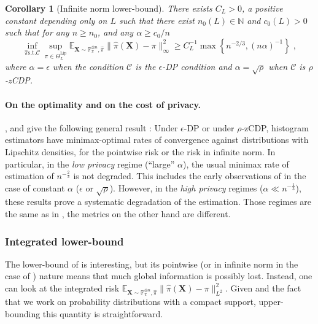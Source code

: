 \documentclass[10pt]{article} %
\newtheorem{corollary}{Corollary}
\newcommand{\N}[0]{\mathbb{N}}
\newcommand{\Prob}[0]{\mathbb{P}}
\newcommand{\E}[0]{\mathbb{E}}
\newcommand\vect[1]{\mathbf{#1}}
\newcommand\RG[1]{\textcolor{red}{#1}}
\newcommand\mRG[1]{\marginpar{\tiny\RG{#1}}}
\begin{document}
\begin{corollary}[Infinite norm lower-bound]
\label{cor:linfdp}
There exists $C_L>0$, a positive constant depending only on $L$ such that there exist $n_0(L) \in \N$ and $c_0(L) > 0$ such that for any $n \geq n_0$, and any 
$\alpha \geq c_0/n$
\begin{equation}
\label{eq:deftriangle}
    \inf_{\hat{\pi} \mathrm{ s.t. } \mathcal{C}} \sup_{\pi \in \Theta^{\mathrm{Lip}}_L}
    \E_{\vect{X} \sim \Prob_{\pi}^{\otimes n}, \hat{\pi}}\|\hat{\pi}(\vect{X})- \pi\|_{\infty}^2  \geq C_L^{-1} \max \left\{ n^{-2/3}, (n\alpha)^{-1} \right\}
    \;,
\end{equation}
where $\alpha = \epsilon$ when the condition $\mathcal{C}$ is the $\epsilon$-DP condition and $\alpha = \sqrt{\rho}$ when %
$\mathcal{C}$ is $\rho$-zCDP.
\end{corollary}

\paragraph{On the optimality and on the cost of privacy.}

,  and  give the following general result : Under $\epsilon$-DP or under $\rho$-zCDP, histogram estimators have minimax-optimal rates of convergence against distributions with Lipschitz densities, for the pointwise risk or the risk in infinite norm. In particular, in the \emph{low privacy} regime (``large'' $\alpha$), the usual minimax rate of estimation of $n^{-\frac{2}{3}}$ is not degraded. This includes the early observations of \citet{wasserman2010statistical} in the case of constant $\alpha$ ($\epsilon$ or $\sqrt{\rho}$). However, in the \emph{high privacy} regimes ($\alpha \ll n^{-\frac{1}{3}}$), these results prove a systematic degradation of the estimation. Those regimes are the same as in \citet{barber2014privacy}, the metrics on the other hand are different. %

\subsubsection{Integrated lower-bound} 

The lower-bound of  is interesting, but its pointwise (or in infinite norm in the case of ) nature means that much global information is possibly lost. 
Instead,
one can look at the integrated risk $\E_{\vect{X} \sim \Prob_{\pi}^{\otimes n}, \hat{\pi}}\|\hat{\pi}(\vect{X})- \pi\|_{L^2}^2$. Given  and the fact that we work on probability distributions with a compact support, upper-bounding this quantity is straightforward.
\end{document}
